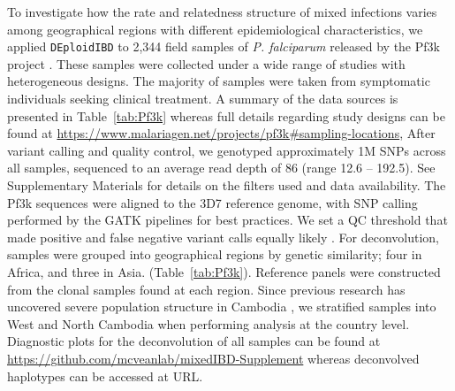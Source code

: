 \documentclass[9pt,lineno]{elife}
\begin{document}
To investigate how the rate and relatedness structure of mixed infections varies among geographical regions with different epidemiological characteristics, we applied \texttt{DEploidIBD} to 2,344 field samples of {\it P. falciparum} released by the Pf3k project \citep{pf3k}.  These samples were collected under a wide range of studies with heterogeneous designs. The majority of samples were taken from symptomatic individuals seeking clinical treatment. A summary of the data sources is presented in Table~\ref{tab:Pf3k} whereas full details regarding study designs can be found at \url{https://www.malariagen.net/projects/pf3k#sampling-locations},  After variant calling and quality control, we genotyped approximately 1M SNPs across all samples, sequenced to an average read depth of 86 (range 12.6 -- 192.5).  See Supplementary Materials for details on the filters used and data availability. The Pf3k sequences were aligned to the 3D7 reference genome, with SNP calling performed by the GATK pipelines for best practices. We set a QC threshold that made positive and false negative variant calls equally likely \citep{pf3k}. For deconvolution, samples were grouped into geographical regions by genetic similarity; four in Africa, and three in Asia. (Table~\ref{tab:Pf3k}). Reference panels were constructed from the clonal samples found at each region. Since previous research has uncovered severe population structure in Cambodia \citep{Miotto2013}, we stratified samples into West and North Cambodia when performing analysis at the country level. Diagnostic plots for the deconvolution of all samples can be found at \url{https://github.com/mcveanlab/mixedIBD-Supplement} whereas deconvolved haplotypes can be accessed at URL.
\end{document}
